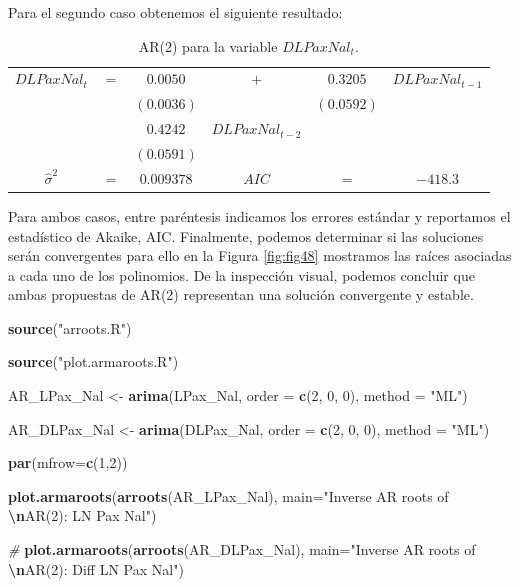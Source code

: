 \documentclass[
]{book}
\newenvironment{Shaded}{\begin{snugshade}}{\end{snugshade}}
\newcommand{\AttributeTok}[1]{\textcolor[rgb]{0.13,0.29,0.53}{#1}}
\newcommand{\CommentTok}[1]{\textcolor[rgb]{0.56,0.35,0.01}{\textit{#1}}}
\newcommand{\DecValTok}[1]{\textcolor[rgb]{0.00,0.00,0.81}{#1}}
\newcommand{\FunctionTok}[1]{\textcolor[rgb]{0.13,0.29,0.53}{\textbf{#1}}}
\newcommand{\NormalTok}[1]{#1}
\newcommand{\OtherTok}[1]{\textcolor[rgb]{0.56,0.35,0.01}{#1}}
\newcommand{\SpecialCharTok}[1]{\textcolor[rgb]{0.81,0.36,0.00}{\textbf{#1}}}
\newcommand{\StringTok}[1]{\textcolor[rgb]{0.31,0.60,0.02}{#1}}
\begin{document}
Para el segundo caso obtenemos el siguiente resultado:

\begin{longtable}[]{@{}cccccc@{}}
\caption{\label{tab:AR0201} AR(2) para la variable \(DLPaxNal_t\).}\tabularnewline
\toprule\noalign{}
\endfirsthead
\endhead
\bottomrule\noalign{}
\endlastfoot
\(DLPaxNal_t\) & \(=\) & \(0.0050\) & \(+\) & \(0.3205\) & \(DLPaxNal_{t-1}\) \\
& & \((0.0036)\) & & \((0.0592)\) & \\
& & \(0.4242\) & \(DLPaxNal_{t-2}\) & & \\
& & \((0.0591)\) & & & \\
\(\hat{\sigma}^2\) & \(=\) & \(0.009378\) & \(AIC\) & \(=\) & \(-418.3\) \\
\end{longtable}

Para ambos casos, entre paréntesis indicamos los errores estándar y reportamos el estadístico de Akaike, AIC. Finalmente, podemos determinar si las soluciones serán convergentes para ello en la Figura \ref{fig:fig48} mostramos las raíces asociadas a cada uno de los polinomios. De la inspección visual, podemos concluir que ambas propuestas de AR(2) representan una solución convergente y estable.

\begin{Shaded}
\begin{Highlighting}[]
\FunctionTok{source}\NormalTok{(}\StringTok{"arroots.R"}\NormalTok{)}

\FunctionTok{source}\NormalTok{(}\StringTok{"plot.armaroots.R"}\NormalTok{)}

\NormalTok{AR\_LPax\_Nal }\OtherTok{\textless{}{-}} \FunctionTok{arima}\NormalTok{(LPax\_Nal, }\AttributeTok{order =} \FunctionTok{c}\NormalTok{(}\DecValTok{2}\NormalTok{, }\DecValTok{0}\NormalTok{, }\DecValTok{0}\NormalTok{), }
                     \AttributeTok{method =} \StringTok{"ML"}\NormalTok{)}

\NormalTok{AR\_DLPax\_Nal }\OtherTok{\textless{}{-}} \FunctionTok{arima}\NormalTok{(DLPax\_Nal, }\AttributeTok{order =} \FunctionTok{c}\NormalTok{(}\DecValTok{2}\NormalTok{, }\DecValTok{0}\NormalTok{, }\DecValTok{0}\NormalTok{), }
                      \AttributeTok{method =} \StringTok{"ML"}\NormalTok{)}

\FunctionTok{par}\NormalTok{(}\AttributeTok{mfrow=}\FunctionTok{c}\NormalTok{(}\DecValTok{1}\NormalTok{,}\DecValTok{2}\NormalTok{))}

\FunctionTok{plot.armaroots}\NormalTok{(}\FunctionTok{arroots}\NormalTok{(AR\_LPax\_Nal), }
               \AttributeTok{main=}\StringTok{"Inverse AR roots of }\SpecialCharTok{\textbackslash{}n}\StringTok{AR(2): LN Pax Nal"}\NormalTok{)}

\CommentTok{\#}
\FunctionTok{plot.armaroots}\NormalTok{(}\FunctionTok{arroots}\NormalTok{(AR\_DLPax\_Nal), }
               \AttributeTok{main=}\StringTok{"Inverse AR roots of }\SpecialCharTok{\textbackslash{}n}\StringTok{AR(2): Diff LN Pax Nal"}\NormalTok{)}
\end{Highlighting}
\end{Shaded}
\end{document}
